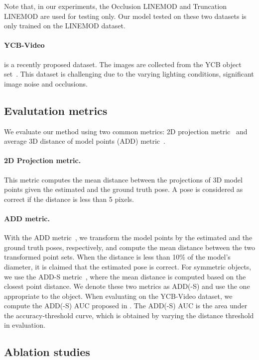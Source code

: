 \documentclass[10pt,twocolumn,letterpaper]{article}
\begin{document}
Note that, in our experiments, the Occlusion LINEMOD and Truncation LINEMOD are used for testing only. Our model tested on these two datasets is only trained on the LINEMOD dataset.

\paragraph{YCB-Video~\cite{xiang2017posecnn}} is a recently proposed dataset. The images are collected from the YCB object set~\cite{calli2015ycb}. This dataset is challenging due to the varying lighting conditions, significant image noise and occlusions.

\subsection{Evalutation metrics}

We evaluate our method using two common metrics: 2D projection metric~\cite{brachmann2016uncertainty} and average 3D distance of model points (ADD) metric~\cite{hinterstoisser2012model}.

\paragraph{2D Projection metric.} This metric computes the mean distance between the projections of 3D model points given the estimated and the ground truth pose. A pose is considered as correct if the distance is less than 5 pixels.

\paragraph{ADD metric.} With the ADD metric~\cite{hinterstoisser2012model}, we transform the model points by the estimated and the ground truth poses, respectively, and compute the mean distance between the two transformed point sets. When the distance is less than 10\% of the model's diameter, it is claimed that the estimated pose is correct. For symmetric objects, we use the ADD-S metric~\cite{xiang2017posecnn}, where the mean distance is computed based on the closest point distance. We denote these two metrics as ADD(-S) and use the one appropriate to the object. When evaluating on the YCB-Video dataset, we compute the ADD(-S) AUC proposed in \cite{xiang2017posecnn}. The ADD(-S) AUC is the area under the accuracy-threshold curve, which is obtained by varying the distance threshold in evaluation.

\subsection{Ablation studies}
\label{sec:ablation studies}
\end{document}
